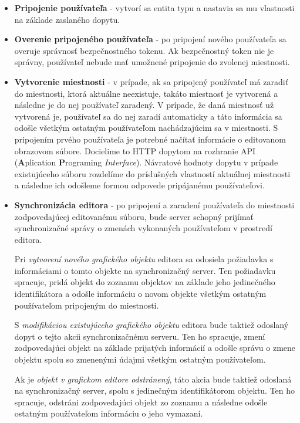 \begin{itemize}
	\item \textbf{Pripojenie používateľa} - vytvorí sa entita typu  a nastavia sa mu vlastnosti na základe zaslaného dopytu. 
	
	\item \textbf{Overenie pripojeného používateľa} - po pripojení nového používateľa sa overuje správnosť bezpečnostného tokenu. Ak bezpečnostný token nie je správny, používateľ nebude mať umožnené pripojenie do zvolenej miestnosti.
	
	\item \textbf{Vytvorenie miestnosti} - v prípade, ak sa pripojený používateľ má zaradiť do miestnosti, ktorá aktuálne neexistuje, takáto miestnosť je vytvorená a následne je do nej používateľ zaradený. V prípade, že daná miestnosť už vytvorená je, používateľ sa do nej zaradí automaticky a táto informácia sa odošle všetkým ostatným používateľom nachádzajúcim sa v miestnosti. S pripojením prvého používateľa je potrebné načítať informácie o editovanom obrazovom súbore. Docielime to HTTP dopytom na rozhranie API (\textbf{A}plication \textbf{P}rograming \textit{Interface}). Návratové hodnoty dopytu v prípade existujúceho súboru rozdelíme do príslušných vlastností aktuálnej miestnosti a následne ich odošleme formou odpovede pripájanému používateľovi.
	
	\item \textbf{Synchronizácia editora} - po pripojení a zaradení používateľa do miestnosti zodpovedajúcej editovanému súboru, bude server schopný prijímať synchronizačné správy o zmenách vykonaných používateľom v prostredí editora. 
	
	Pri \textit{vytvorení nového grafického objektu} editora sa odosiela požiadavka s informáciami o tomto objekte na synchronizačný server. Ten požiadavku spracuje, pridá objekt do zoznamu objektov na základe jeho jedinečného identifikátora a odošle informáciu o novom objekte všetkým ostatným používateľom pripojeným do miestnosti.
	
	S \textit{modifikáciou existujúceho grafického objektu} editora bude taktiež odoslaný dopyt o tejto akcii synchronizačnému serveru. Ten ho spracuje, zmení zodpovedajúci objekt na základe prijatých informácií a odošle správu o zmene objektu spolu so zmenenými údajmi všetkým ostatným používateľom.
	
	Ak je \textit{objekt v grafickom editore odstránený}, táto akcia bude taktiež odoslaná na synchronizačný server, spolu s jedinečným identifikátorom objektu. Ten ho spracuje, odstráni zodpovedajúci objekt zo zoznamu a následne odošle ostatným používateľom informáciu o jeho vymazaní.
	

\end{itemize}

